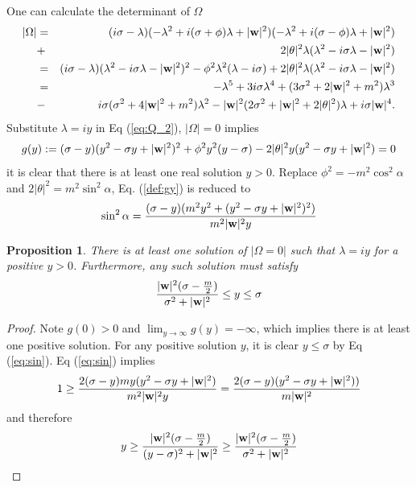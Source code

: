 \documentclass[10pt,reqno]{amsart}
\renewcommand{\(}{\left(}
\renewcommand{\)}{\right)}
\newcommand{\bw}{{\bf w}}
\newtheorem{prop}[theo]{Proposition}
\numberwithin{equation}{section}
\begin{document}
One can calculate the determinant of $\Omega$
\begin{eqnarray}
|\Omega| &=& (i\sigma -\lambda )(-\lambda^2+ i(\sigma+\phi)\lambda + |\bw|^2 )( -\lambda^2+ i(\sigma-\phi)\lambda + |\bw|^2) \nonumber\\
&+& 2|\theta|^2 \lambda(\lambda^2 - i\sigma\lambda -|\bw|^2)\label{eq:Q_1}\\
&=& (i\sigma -\lambda )(\lambda^2 -i\sigma\lambda -|\bw|^2 )^2 -\phi^2 \lambda^2 (\lambda-i\sigma) + 2|\theta|^2 \lambda(\lambda^2 - i\sigma\lambda -|\bw|^2) \label{eq:Omega} \label{eq:Q_2}\\
&=& -\lambda^5 + 3i\sigma\lambda^4 + (3\sigma^2 + 2|\bw|^2 + m^2) \lambda^3 \nonumber\\
&-& i\sigma (\sigma^2 + 4|\bw|^2 + m^2)\lambda^2 - |\bw|^2 (2\sigma^2 + |\bw|^2 + 2|\theta|^2) \lambda + i\sigma|\bw|^4. \label{eq:Q_3}
\end{eqnarray}
Substitute  $\lambda = iy$ in Eq (\ref{eq:Q_2}),  $|\Omega|=0$ implies 
\begin{equation}\label{def:gy}
g(y):=(\sigma -y)(y^2 -\sigma y +|\bw|^2 )^2 +\phi^2 y^2 (y-\sigma) -2|\theta|^2 y(y^2 - \sigma y +|\bw|^2)=0 
\end{equation}
it is clear that there is at least one  real solution $y>0$. Replace $\phi^2=-m^2 \cos^2\alpha$ and $2|\theta|^2 = m^2 \sin^2\alpha$,  Eq. (\ref{def:gy}) is reduced to 
\begin{equation}\label{eq:sin}
\sin^2\alpha = \frac{(\sigma - y)(m^2y^2 + (y^2-\sigma y + |\bw|^2)^2 )}{m^2 |\bw|^2 y}
\end{equation}
\begin{prop}
There is at least one solution of $|\Omega=0|$ such that $\lambda=iy$ for a positive $y>0$. Furthermore, any such solution must satisfy
\begin{equation}
	  \frac{|\bw|^2 (\sigma -\frac m2)}{\sigma^2 + |\bw|^2} \le y \le \sigma
\end{equation}
\end{prop}
\begin{proof}
Note $g(0)>0$ and $\lim_{y\to \infty}g(y) = -\infty$,  which implies there is at least one positive solution. For any positive solution $y$,  it is clear $y\le \sigma$ by Eq (\ref{eq:sin}).  Eq (\ref{eq:sin}) implies
\[
1\ge   \frac{2(\sigma - y)my(y^2-\sigma y + |\bw|^2)}{m^2 |\bw|^2 y} = \frac{2(\sigma - y)(y^2-\sigma y + |\bw|^2) )}{m |\bw|^2 } 
\] 
and therefore
\[
y \ge \frac{|\bw|^2 (\sigma-\frac m2)}{(y-\sigma)^2 + |\bw|^2} \ge \frac{|\bw|^2 (\sigma-\frac m2)}{\sigma^2 + |\bw|^2} 
\]
\end{proof}
\end{document}
